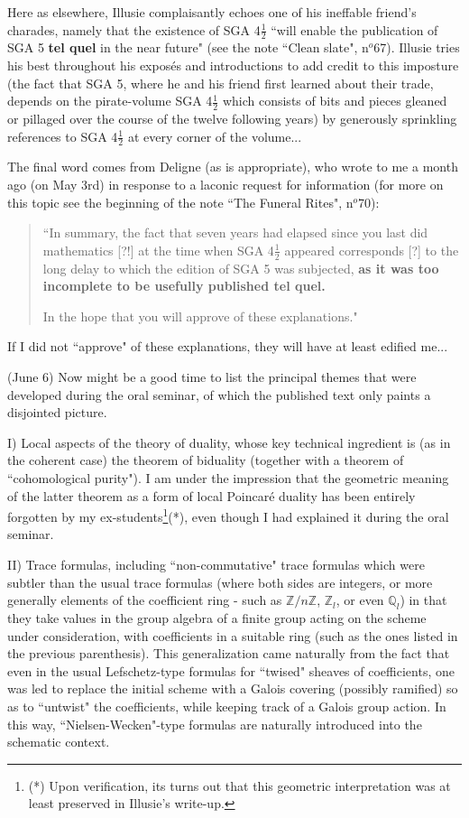 Here as elsewhere, Illusie complaisantly echoes one of his ineffable friend's charades, namely that the existence of SGA 4$\frac{1}{2}$ ``will enable the publication of SGA 5 \textbf{tel quel} in the near future" (see the note ``Clean slate", n$^o$67). Illusie tries his best throughout his expos\'es and introductions to add credit to this imposture (the fact that SGA 5, where he and his friend first learned about their trade, depends on the pirate-volume SGA 4$\frac{1}{2}$ which consists of bits and pieces gleaned or pillaged over the course of the twelve following years) by generously sprinkling references to SGA 4$\frac{1}{2}$ at every corner of the volume...

The final word comes from Deligne (as is appropriate), who wrote to me a month ago (on May 3rd) in response to a laconic request for information (for more on this topic see the beginning of the note ``The Funeral Rites", n$^o$70):

\begin{quote}
``In summary, the fact that seven years had elapsed since you last did mathematics [?!] at the time when SGA 4$\frac{1}{2}$ appeared corresponds [?] to the long delay to which the edition of SGA 5 was subjected, \textbf{as it was too incomplete to be usefully published tel quel.}

In the hope that you will approve of these explanations."
\end{quote}

If I did not ``approve" of these explanations, they will have at least edified me...

 (June 6) Now might be a good time to list the principal themes that were developed during the oral seminar, of which the published text only paints a disjointed picture. 

I) Local aspects of the theory of duality, whose key technical ingredient is (as in the coherent case) the theorem of biduality (together with a theorem of ``cohomological purity"). I am under the impression that the geometric meaning of the latter theorem as a form of local Poincar\'e duality has been entirely forgotten by my ex-students\footnote{(*) Upon verification, its turns out that this geometric interpretation was at least preserved in Illusie's write-up.}(*), even though I had explained it during the oral seminar.

II) Trace formulas, including ``non-commutative" trace formulas which were subtler than the usual trace formulas (where both sides are integers, or more generally elements of the coefficient ring - such as $\mathbb{Z}/n\mathbb{Z}$, $\mathbb{Z}_l$, or even $\mathbb{Q}_l$) in that they take values in the group algebra of a finite group acting on the scheme under consideration, with coefficients in a suitable ring (such as the ones listed in the previous parenthesis). This generalization came naturally from the fact that even in the usual Lefschetz-type formulas for ``twised" sheaves of coefficients, one was led to replace the initial scheme with a Galois covering (possibly ramified) so as to ``untwist" the coefficients, while keeping track of a Galois group action. In this way, ``Nielsen-Wecken"-type formulas are naturally introduced into the schematic context.

